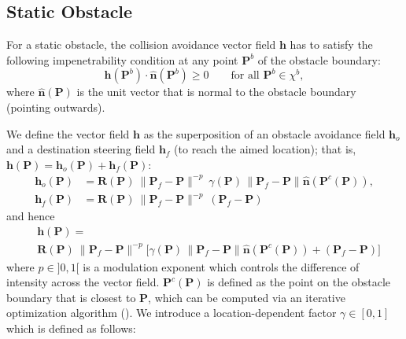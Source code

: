 \subsection{Static Obstacle}

For a static obstacle, the collision avoidance vector field $\bm{h}$ has to satisfy the following impenetrability condition at any point $\bm{P}^b$ of the obstacle boundary:
\begin{equation}
\label{eq:stat_bos}
\bm{h}(\bm{P}^b) \cdot \hat{\bm{n}}(\bm{P}^b) \ge 0 \qquad \textrm{for all } \bm{P}^b \in \chi^b,
\end{equation}
where $\hat{\bm{n}}(\bm{P})$ is the unit vector that is normal to the obstacle boundary (pointing outwards).

We define the vector field $\bm{h}$ as the superposition of an obstacle avoidance field $\bm{h}_o$ and a destination steering field $\bm{h}_f$ (to reach the aimed location); that is, $\bm{h}(\bm{P})=\bm{h}_o(\bm{P}) + \bm{h}_f(\bm{P})$:
\begin{align*}
   \bm{h}_o(\bm{P}) &= \bm{R}(\bm{P}) \ \|\bm{P}_f - \bm{P}\|^{-p} \ \gamma(\bm{P}) \, \|\bm{P}_f - \bm{P}\| \hat{\bm{n}}(\bm{P}^c(\bm{P})), \\
    \bm{h}_f(\bm{P}) &= \bm{R}(\bm{P}) \ \|\bm{P}_f - \bm{P}\|^{-p} \ (\bm{P}_f - \bm{P})
\end{align*}
and hence
\begin{align} \label{eq:h}
    &\bm{h}(\bm{P}) = \\
    &\bm{R}(\bm{P}) \ \|\bm{P}_f - \bm{P}\|^{-p} \Big[ \gamma(\bm{P}) \, \|\bm{P}_f - \bm{P}\| \hat{\bm{n}}(\bm{P}^c(\bm{P})) + (\bm{P}_f - \bm{P}) \Big] \nonumber
\end{align}
where $p \in ]0,1[$ is a modulation exponent which controls the difference of intensity across the vector field. $\bm{P}^c(\bm{P})$ is defined as the point on the obstacle boundary that is closest to $\bm{P}$, which can be computed via an iterative optimization algorithm (\cite{nurnberg2006distance}). We introduce a location-dependent factor $\gamma \in [0,1]$ which is defined as follows:
